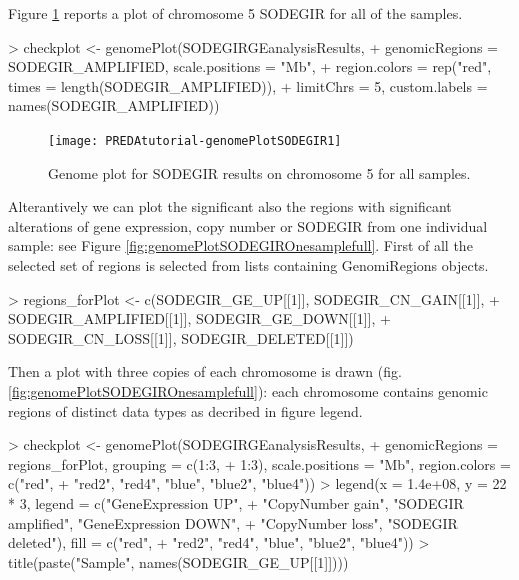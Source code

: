 \documentclass[a4paper,10pt]{article}
\begin{document}
Figure \ref{fig:genomePlotSODEGIROnechromosome} reports a plot of chromosome 5 SODEGIR for all of the samples.

\begin{Schunk}
\begin{Sinput}
> checkplot <- genomePlot(SODEGIRGEanalysisResults, 
+     genomicRegions = SODEGIR_AMPLIFIED, scale.positions = "Mb", 
+     region.colors = rep("red", times = length(SODEGIR_AMPLIFIED)), 
+     limitChrs = 5, custom.labels = names(SODEGIR_AMPLIFIED))
\end{Sinput}
\end{Schunk}



\begin{figure}[htbp]
 \centering
\texttt{[image: PREDAtutorial-genomePlotSODEGIR1]}
 \caption{Genome plot for SODEGIR results on chromosome 5 for all samples.}
 \label{fig:genomePlotSODEGIROnechromosome}
\end{figure}


Alterantively we can plot the significant also the regions with significant alterations of gene expression, copy number or SODEGIR from one individual sample: see Figure \ref{fig:genomePlotSODEGIROnesamplefull}.
First of all the selected set of regions is selected from lists containing GenomiRegions objects.

\begin{Schunk}
\begin{Sinput}
> regions_forPlot <- c(SODEGIR_GE_UP[[1]], SODEGIR_CN_GAIN[[1]], 
+     SODEGIR_AMPLIFIED[[1]], SODEGIR_GE_DOWN[[1]], 
+     SODEGIR_CN_LOSS[[1]], SODEGIR_DELETED[[1]])
\end{Sinput}
\end{Schunk}

Then a plot with three copies of each chromosome is drawn (fig.\ref{fig:genomePlotSODEGIROnesamplefull}): each chromosome contains genomic regions of distinct data types as decribed in figure legend.

\begin{Schunk}
\begin{Sinput}
> checkplot <- genomePlot(SODEGIRGEanalysisResults, 
+     genomicRegions = regions_forPlot, grouping = c(1:3, 
+         1:3), scale.positions = "Mb", region.colors = c("red", 
+         "red2", "red4", "blue", "blue2", "blue4"))
> legend(x = 1.4e+08, y = 22 * 3, legend = c("GeneExpression UP", 
+     "CopyNumber gain", "SODEGIR amplified", "GeneExpression DOWN", 
+     "CopyNumber loss", "SODEGIR deleted"), fill = c("red", 
+     "red2", "red4", "blue", "blue2", "blue4"))
> title(paste("Sample", names(SODEGIR_GE_UP[[1]])))
\end{Sinput}
\end{Schunk}
\end{document}
